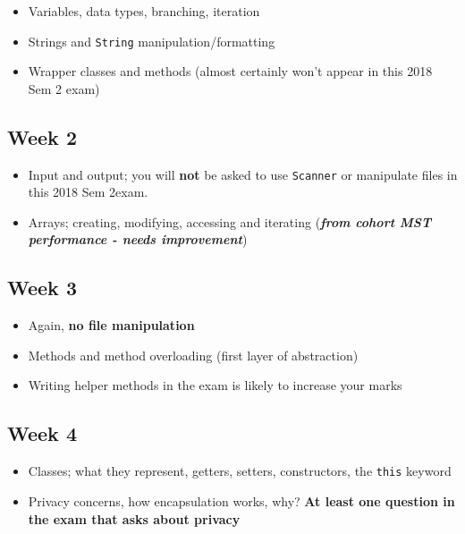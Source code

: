\documentclass[]{article}
\providecommand{\tightlist}{%
  \setlength{\itemsep}{0pt}\setlength{\parskip}{0pt}}
\begin{document}
\begin{itemize}
\tightlist
\item
  Variables, data types, branching, iteration
\item
  Strings and \texttt{String} manipulation/formatting
\item
  Wrapper classes and methods (almost certainly won't appear in this
  2018 Sem 2 exam)
\end{itemize}

\hypertarget{week-2}{%
\subsection{Week 2}\label{week-2}}

\begin{itemize}
\tightlist
\item
  Input and output; you will \textbf{not} be asked to use
  \texttt{Scanner} or manipulate files in this 2018 Sem 2exam.
\item
  Arrays; creating, modifying, accessing and iterating
  (\textbf{\emph{from cohort MST performance - needs improvement}})
\end{itemize}

\hypertarget{week-3}{%
\subsection{Week 3}\label{week-3}}

\begin{itemize}
\tightlist
\item
  Again, \textbf{no file manipulation}
\item
  Methods and method overloading (first layer of abstraction)
\item
  Writing helper methods in the exam is likely to increase your marks
\end{itemize}

\hypertarget{week-4}{%
\subsection{Week 4}\label{week-4}}

\begin{itemize}
\tightlist
\item
  Classes; what they represent, getters, setters, constructors, the
  \texttt{this} keyword
\item
  Privacy concerns, how encapsulation works, why? \textbf{At least one
  question in the exam that asks about privacy}
\end{itemize}
\end{document}
